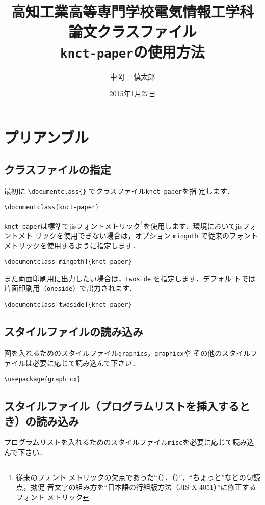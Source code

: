 \documentclass[mingoth]{knct-paper}		%
\title{
高知工業高等専門学校電気情報工学科\\
論文クラスファイル\\
\texttt{knct-paper}の使用方法
}
\author{中岡 　慎太郎}
\date{2015年1月27日}
\begin{document}
\maketitle

\chapter{プリアンブル}

 \section{クラスファイルの指定}
 最初に \verb|\documentclass{}| でクラスファイル\texttt{knct-paper}を指
 定します．
\begin{verbatim}
\documentclass{knct-paper}
\end{verbatim}
 
 \texttt{knct-paper}は標準でjisフォントメトリック\footnote{従来のフォント
 メトリックの欠点であった``（）．（）''，``ちょっと''などの句読点，拗促
 音文字の組み方を``日本語の行組版方法（JIS X 4051）''に修正するフォント
 メトリック\cite{bib:latex2e}}を使用します．環境においてjisフォントメト
 リックを使用できない場合は，オプション \verb|mingoth| で従来のフォント
 メトリックを使用するように指定します．
\begin{verbatim}
\documentclass[mingoth]{knct-paper}
\end{verbatim}

 また両面印刷用に出力したい場合は，\verb|twoside| を指定します．デフォル
 トでは片面印刷用（\verb|oneside|）で出力されます．
\begin{verbatim}
\documentclass[twoside]{knct-paper}
\end{verbatim}

 \section{スタイルファイルの読み込み}
 図を入れるためのスタイルファイル\texttt{graphics}，\texttt{graphicx}や
 その他のスタイルファイルは必要に応じて読み込んで下さい．

\begin{verbatim}
\usepackage{graphicx}
\end{verbatim}

 \section{スタイルファイル（プログラムリストを挿入するとき）の読み込み}
 プログラムリストを入れるためのスタイルファイル\texttt{misc}を必要に応じて読み込んで下さい．
\end{document}
